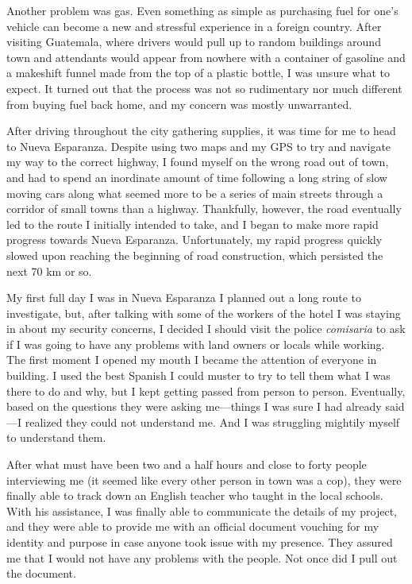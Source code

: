 {Another problem was gas. Even something as simple as purchasing fuel for one’s vehicle can become a new and stressful experience in a foreign country. After visiting Guatemala, where drivers would pull up to random buildings around town and attendants would appear from nowhere with a container of gasoline and a makeshift funnel made from the top of a plastic bottle, I was unsure what to expect. It turned out that the process was not so rudimentary nor much different from buying fuel back home, and my concern was mostly unwarranted.

After driving throughout the city gathering supplies, it was time for me to head to Nueva Esparanza. Despite using two maps and my GPS to try and navigate my way to the correct highway, I found myself on the wrong road out of town, and had to spend an inordinate amount of time following a long string of slow moving cars along what seemed more to be a series of main streets through a corridor of small towns than a highway. Thankfully, however, the road eventually led to the route I initially intended to take, and I began to make more rapid progress towards Nueva Esparanza.
Unfortunately, my rapid progress quickly slowed upon reaching the beginning of road construction, which persisted the next 70 km or so.

My first full day I was in Nueva Esparanza I planned out a long route to investigate, but, after talking with some of the workers of the hotel I was staying in about my security concerns, I decided I should visit the police \textit{comisaria} to ask if I was going to have any problems with land owners or locals while working. The first moment I opened my mouth I became the attention of everyone in building. I used the best Spanish I could muster to try to tell them what I was there to do and why, but I kept getting passed from person to person. Eventually, based on the questions they were asking me—things I was sure I had already said—I realized they could not understand me. And I was struggling mightily myself to understand them.

After what must have been two and a half hours and close to forty people interviewing me (it seemed like every other person in town was a cop), they were finally able to track down an English teacher who taught in the local schools. With his assistance, I was finally able to communicate the details of my project, and they were able to provide me with an official document vouching for my identity and purpose in case anyone took issue with my presence. They assured me that I would not have any problems with the people. Not once did I pull out the document.

}
